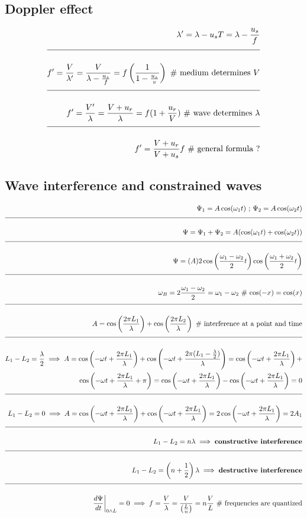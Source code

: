 \documentclass[a4paper]{article}
\newcommand{\eqComment}[1]{\text{  \# #1}}
\newcommand{\eqSep}{\text{ ;  }}
\newcommand{\n}{\\[1.5ex] \hline \nonumber \\[0ex]}
\newcommand{\m}{\nonumber \\}
\begin{document}
\subsection{Doppler effect}
\begin{tcolorbox}
\begin{align}
   \lambda^\prime = \lambda - u_s T = \lambda - \frac{u_s}{f}
\n f^\prime = \frac{V}{\lambda^\prime} = \frac{V}{\lambda - \frac{u_s}{f}} = f \left(\frac{1}{1 - \frac{u_s}{v}}\right) \eqComment{medium determines $V$}
\n  f^\prime = \frac{V^\prime}{\lambda} = \frac{V + u_r}{\lambda} = f (1 + \frac{u_r}{V}) \eqComment{wave determines $\lambda$}
\n f^\prime = \frac{V + u_r}{V + u_s} f \eqComment{general formula ?}
\end{align}
\end{tcolorbox}

\subsection{Wave interference and constrained waves}
\begin{tcolorbox}
\begin{align}
   \Psi_1 = A \cos(\omega_1 t) \eqSep \Psi_2 = A \cos(\omega_2 t)
\n \Psi = \Psi_1 + \Psi_2 = A (\cos(\omega_1 t) + \cos(\omega_2 t))
\n \Psi = (A) 2 \cos\left(\frac{\omega_1-\omega_2}{2} t\right) \cos\left(\frac{\omega_1+\omega_2}{2} t\right)
\n \omega_B = 2 \frac{\omega_1-\omega_2}{2} = \omega_1-\omega_2 \eqComment{$\cos(-x) = \cos(x)$}
\n A = \cos\left(\frac{2 \pi L_1}{\lambda}\right) + \cos\left(\frac{2 \pi L_2}{\lambda}\right) \eqComment{interference at a point and time}
\n L_1 - L_2 = \frac{\lambda}{2} \implies A = \cos\left(-\omega t + \frac{2 \pi L_1}{\lambda}\right) + \cos\left(-\omega t + \frac{2 \pi (L_1 - \frac{\lambda}{2})}{\lambda}\right) = \cos\left(-\omega t + \frac{2 \pi L_1}{\lambda}\right) +
\m \cos\left(-\omega t + \frac{2 \pi L_1}{\lambda} + \pi\right) = \cos\left(-\omega t + \frac{2 \pi L_1}{\lambda}\right) - \cos\left(-\omega t + \frac{2 \pi L_1}{\lambda}\right) = 0
\n L_1 - L_2 = 0 \implies A = \cos\left(-\omega t + \frac{2 \pi L_1}{\lambda}\right) + \cos\left(-\omega t + \frac{2 \pi L_1}{\lambda}\right) = 2 \cos\left(-\omega t + \frac{2 \pi L_1}{\lambda}\right) = 2 A_1
\n L_1 - L_2 = n \lambda \implies \textbf{constructive interference}
\n L_1 - L_2 = \left(n+\frac{1}{2}\right) \lambda \implies \textbf{destructive interference}
\n \left.\frac{d \Psi}{dt}\right|_{0 \land L} = 0 \implies f = \frac{V}{\lambda} = \frac{V}{\left(\frac{L}{n}\right)} = n \frac{V}{L} \eqComment{frequencies are quantized}
\end{align}
\end{tcolorbox}
\end{document}
